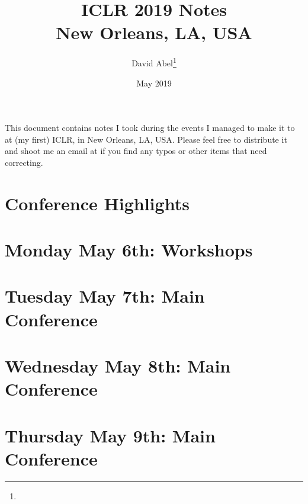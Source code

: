 \documentclass[11pt]{article}
\title{ICLR 2019 Notes \\ \Large{New Orleans, LA, USA}}
\author{David Abel\footnote{\durl{http://david-abel.github.io}} \\ \durl{david_abel@brown.edu}}
\date{May 2019}
\begin{document}
\maketitle
\tableofcontents
\newpage


This document contains notes I took during the events I managed to make it to at (my first) ICLR, in New Orleans, LA, USA. Please feel free to distribute it and shoot me an email at  if you find any typos or other items that need correcting.



\section{Conference Highlights}


\newpage
\section{Monday May 6th: Workshops}




\newpage
\section{Tuesday May 7th: Main Conference}




\newpage
\section{Wednesday May 8th: Main Conference}




\newpage
\section{Thursday May 9th: Main Conference}






\newpage


\end{document}
